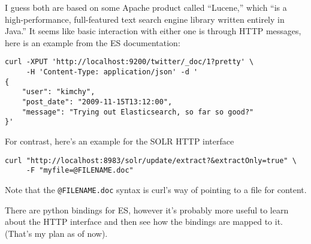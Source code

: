 \documentclass{article}
\begin{document}
I guess both are based on some Apache product called ``Lucene,'' which ``is a high-performance, full-featured text search engine library written entirely in Java.''  It seems like basic interaction with either one is through HTTP messages, here is an example from the ES documentation:
\begin{verbatim}
curl -XPUT 'http://localhost:9200/twitter/_doc/1?pretty' \
     -H 'Content-Type: application/json' -d '
{
    "user": "kimchy",
    "post_date": "2009-11-15T13:12:00",
    "message": "Trying out Elasticsearch, so far so good?"
}'
\end{verbatim}

For contrast, here's an example for the SOLR HTTP interface

\begin{verbatim}
curl "http://localhost:8983/solr/update/extract?&extractOnly=true" \
     -F "myfile=@FILENAME.doc"
\end{verbatim}

Note that the \verb|@FILENAME.doc| syntax is curl's way of pointing to a file for content.

There are python bindings for ES, however it's probably more useful to learn about the HTTP interface and then see how the bindings are mapped to it.  (That's my plan as of now).
\end{document}
